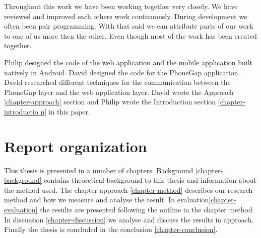 Throughout this work we have been working together very closely. We have reviewed and improved each others work continuously. During development we often been pair programming. With that said we can attribute parts of our work to one of us more then the other. Even though most of the work has been created together. 

Philip designed the code of the web application and the mobile application built natively in Android. David designed the code for the PhoneGap application. David researched different techniques for the communication between the PhoneGap layer and the web application layer. David wrote the Approach \ref{chapter-approach} section and Philip wrote the Introduction section \ref{chapter-introductio
n} in this paper. 

\section{Report organization}\label{section-report-organization}
This thesis is presented in a number of chapters. Background \ref{chapter-background} contains theoretical background to this thesis and information about the method used. The chapter approach \ref{chapter-method} describes our research method and how we measure and analyse the result. In evaluation\ref{chapter-evaluation} the results are presented following the outline in the chapter method. In discussion \ref{chapter-discussion} we analyse and discuss the results in approach. Finally the thesis is concluded in the conclusion \ref{chapter-conclusion}.